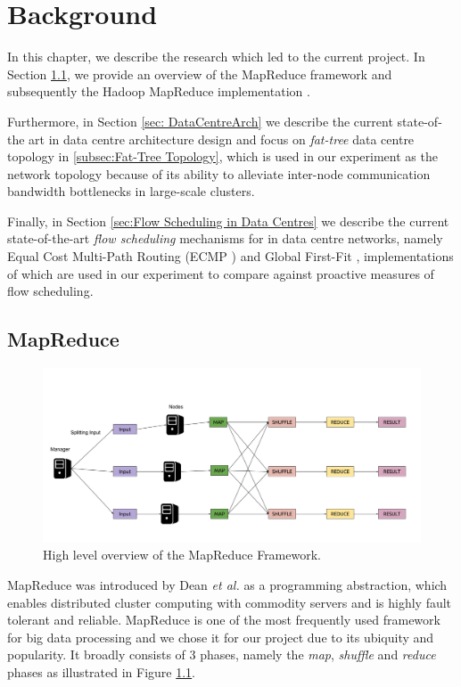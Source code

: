 \chapter{Background} \label{chap:Background}

In this chapter, we describe the research which led to the current project. In Section \ref{sec:MapReduce}, we provide an overview of the MapReduce framework and subsequently the Hadoop MapReduce implementation \cite{HadoopWeb}.  

Furthermore, in Section \ref{sec: DataCentreArch} we describe the current state-of-the art in data centre architecture design and focus on  \textit{fat-tree} \cite{al2008scalable} data centre topology in \ref{subsec:Fat-Tree Topology}, which is used in our experiment as the network topology because of its ability to alleviate inter-node communication bandwidth bottlenecks in large-scale clusters. 

Finally, in Section \ref{sec:Flow Scheduling in Data Centres} we describe the current state-of-the-art \textit{flow scheduling} mechanisms for in data centre networks, namely Equal Cost Multi-Path Routing (ECMP \cite{hopps2000analysis}) and Global First-Fit \cite{al2010hedera}, implementations of which are used in our experiment to compare against proactive measures of flow scheduling.   

\section{MapReduce} \label{sec:MapReduce}

\begin{figure}[!ht]
\centerline{\includegraphics[scale=0.30]{GeneralMapReduce.png}}
\caption{High level overview of the MapReduce Framework.}
\label{fig:MROverview}
\end{figure}

MapReduce was introduced by Dean \textit{et al.} \cite{dean2008mapreduce} as a programming abstraction, which enables distributed cluster computing with commodity servers and is highly fault tolerant and reliable. MapReduce is one of the most frequently used framework for big data processing \cite{barroso2013datacenter} and we chose it for our project due to its ubiquity and popularity. It broadly consists of 3 phases, namely the \textit{map}, \textit{shuffle} and \textit{reduce} phases as illustrated in Figure \ref{fig:MROverview}. 
  
